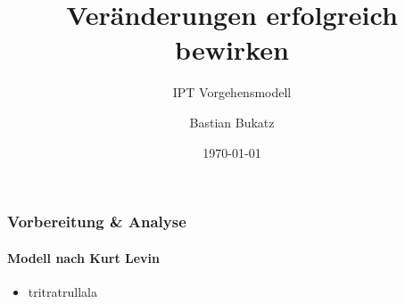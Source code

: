 \documentclass[aspectratio=169]{beamer}
\title{Veränderungen erfolgreich bewirken}
\subtitle{IPT Vorgehensmodell}
\author{Bastian Bukatz}
\institute{Innovation Process Technology}
\date{\today}
\begin{document}
\begin{frame}
\titlepage
\end{frame}



\begin{frame}
\frametitle{Vorbereitung \& Analyse}\framesubtitle{Modell nach Kurt Levin}
\begin{itemize}
\item tritratrullala

\end{itemize}
\end{frame}
\end{document}
